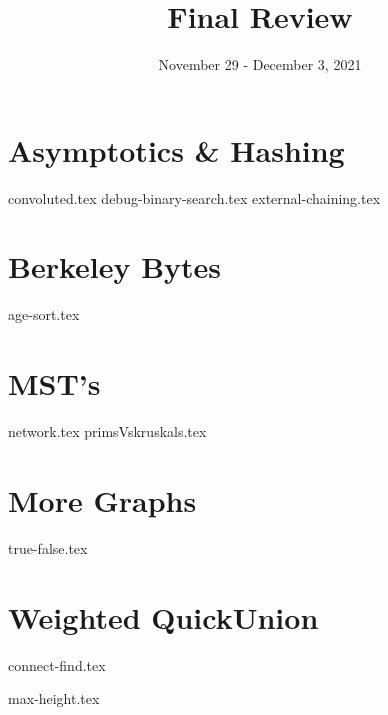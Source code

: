 \documentclass[11pt]{exam}
\title{Final Review}
\date{November 29 - December 3, 2021}
\begin{document}
\maketitle

\section{Asymptotics \& Hashing}
\begin{questions}
{convoluted.tex}
{debug-binary-search.tex}
{external-chaining.tex}
\end{questions}

\newpage
\section{Berkeley Bytes}
\begin{questions}
{age-sort.tex}
\end{questions}

\newpage
\section{MST's}
\begin{questions}
{network.tex}
{primsVskruskals.tex}
\end{questions}

\newpage
\section{More Graphs}
\begin{questions}
{true-false.tex}
\end{questions}

\newpage
\section{Weighted QuickUnion}
\begin{questions}
{connect-find.tex}

{max-height.tex}
\end{questions}
\end{document}
